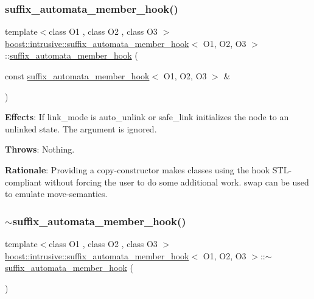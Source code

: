 \subsubsection{\texorpdfstring{suffix\+\_\+automata\+\_\+member\+\_\+hook()}{suffix\_automata\_member\_hook()}\hspace{0.1cm}{\footnotesize\ttfamily [2/2]}}
{\footnotesize\ttfamily template$<$class O1 , class O2 , class O3 $>$ \\
\hyperlink{classboost_1_1intrusive_1_1suffix__automata__member__hook}{boost\+::intrusive\+::suffix\+\_\+automata\+\_\+member\+\_\+hook}$<$ O1, O2, O3 $>$\+::\hyperlink{classboost_1_1intrusive_1_1suffix__automata__member__hook}{suffix\+\_\+automata\+\_\+member\+\_\+hook} (\begin{DoxyParamCaption}\item[{const \hyperlink{classboost_1_1intrusive_1_1suffix__automata__member__hook}{suffix\+\_\+automata\+\_\+member\+\_\+hook}$<$ O1, O2, O3 $>$ \&}]{ }\end{DoxyParamCaption})}

{\bfseries Effects}\+: If link\+\_\+mode is {\ttfamily auto\+\_\+unlink} or {\ttfamily safe\+\_\+link} initializes the node to an unlinked state. The argument is ignored.

{\bfseries Throws}\+: Nothing.

{\bfseries Rationale}\+: Providing a copy-\/constructor makes classes using the hook S\+T\+L-\/compliant without forcing the user to do some additional work. {\ttfamily swap} can be used to emulate move-\/semantics. \mbox{\label{classboost_1_1intrusive_1_1suffix__automata__member__hook_ab81bbc4d673eb8696c87af2fbd6063ff}} 
\subsubsection{\texorpdfstring{$\sim$suffix\+\_\+automata\+\_\+member\+\_\+hook()}{~suffix\_automata\_member\_hook()}}
{\footnotesize\ttfamily template$<$class O1 , class O2 , class O3 $>$ \\
\hyperlink{classboost_1_1intrusive_1_1suffix__automata__member__hook}{boost\+::intrusive\+::suffix\+\_\+automata\+\_\+member\+\_\+hook}$<$ O1, O2, O3 $>$\+::$\sim$\hyperlink{classboost_1_1intrusive_1_1suffix__automata__member__hook}{suffix\+\_\+automata\+\_\+member\+\_\+hook} (\begin{DoxyParamCaption}{ }\end{DoxyParamCaption})}

